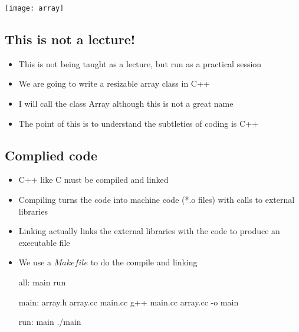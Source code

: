 

\vspace*{-2cm}
\begin{center}
  \texttt{[image: array]}
\end{center}
\vspace*{-1cm}


\begin{slide}
  \section{This is not a lecture!}

  \begin{itemize}
  \item This is not being taught as a lecture, but run as a practical
    session
  \item We are going to write a resizable array class in C++
  \item I will call the class Array although this is not a great name
  \item The point of this is to understand the subtleties of coding is C++
  \end{itemize}

\end{slide}


\begin{slide}
  \section{Complied code}


  \begin{itemize}
  \item C++ like C must be compiled and linked
  \item Compiling turns the code into machine code (*.o files) with
    calls to external libraries
  \item Linking actually links the external libraries with the code to
    produce an executable file
  \item We use a \jl$Makefile$ to do the compile and linking
    \begin{cpp}
      all: main run

      main: array.h array.cc main.cc
          g++ main.cc array.cc -o main

      run: main
	  ./main

    \end{cpp}
  \end{itemize}

\end{slide}

